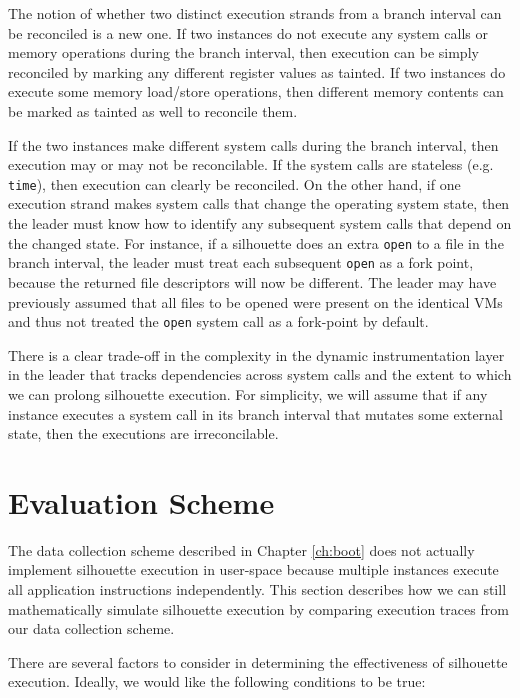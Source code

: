  \newline
The notion of whether two distinct execution strands 
from a branch interval can be reconciled is a new one.
If two instances do not execute
any system calls or memory operations
during the branch interval, then
execution can be simply reconciled
by marking any different register
values as tainted. If two instances
do execute some memory load/store
operations, then different
memory contents can be marked
as tainted as well to reconcile
them.

If the two instances make different system
calls during the branch interval, then execution may
or may not be reconcilable. 
If the system calls are stateless (e.g. \texttt{time}),
then execution can clearly be reconciled.
On the other hand, if one execution strand
makes system calls that change the operating
system state, then the leader must
know how to identify any subsequent
system calls that depend on the changed state.
For instance, if a silhouette does an
extra \texttt{open} to a
file in the branch interval, the leader
must treat each subsequent \texttt{open}
as a fork point, because
the returned file descriptors
will now be different. The
leader may have previously
assumed that all files to be opened were present
on the identical VMs and thus not
treated the \texttt{open} system call
as a fork-point by default.

There is a clear trade-off in the complexity
in the dynamic instrumentation layer in the leader that tracks
dependencies across system calls and
the extent to which we can 
prolong silhouette execution.
For simplicity, we will assume that
if any instance executes
a system call in its branch interval
that mutates some external state, then the executions
are irreconcilable.

\section{Evaluation Scheme} \label{silsimulation}
The data collection scheme described in Chapter \ref{ch:boot} does not
actually implement silhouette execution in user-space 
because multiple instances execute all application instructions independently.
This section describes how we can still mathematically simulate silhouette execution 
by comparing execution traces from our data collection scheme.

\newpage 
There are several factors
to consider in determining the effectiveness
of silhouette execution.
Ideally, we would like the following
conditions to be true:


